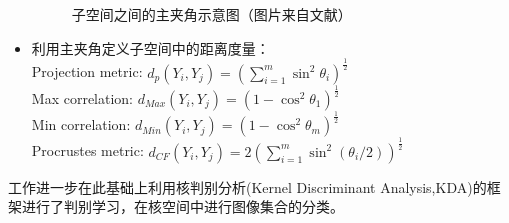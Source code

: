 \begin{itemize}
\begin{figure}[h]
	\caption[子空间之间的主夹角示意图]{子空间之间的主夹角示意图（图片来自文献\cite{Subspace_GDA}）}
	\label{fig:principle_angle}
\end{figure}
\item 利用主夹角定义子空间中的距离度量：\\
Projection metric: $d_p (Y_i,Y_j)=\left(∑_{i=1}^m \sin^2 \theta_i\right)^{\frac{1}{2}}$\\
Max correlation: $d_{Max} (Y_i,Y_j)=\left(1-\cos^2\theta_1\right)^\frac{1}{2}$\\
Min correlation: $d_{Min} (Y_i,Y_j)=\left(1-\cos^2\theta_m\right)^\frac{1}{2}$\\
Procrustes metric: $d_{CF} (Y_i,Y_j)=2\left(∑_{i=1}^{m}\sin^2(\theta_i/2)\right)^\frac{1}{2}$
\end{itemize}

工作\cite{Subspace_GDA}进一步在此基础上利用核判别分析(Kernel Discriminant Analysis,KDA)的框架进行了判别学习，在核空间中进行图像集合的分类。
